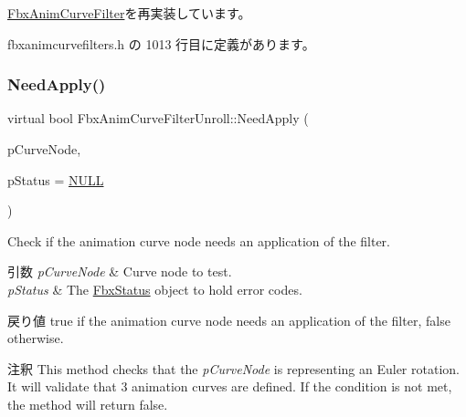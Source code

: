 \hyperlink{class_fbx_anim_curve_filter_a09438dd8d0e9bcb934e6a4b6fc51bcd7}{Fbx\+Anim\+Curve\+Filter}を再実装しています。



 fbxanimcurvefilters.\+h の 1013 行目に定義があります。

\mbox{\label{class_fbx_anim_curve_filter_unroll_ad3df0b89af14237342197a8832e3d94f}} 
\subsubsection{\texorpdfstring{Need\+Apply()}{NeedApply()}\hspace{0.1cm}{\footnotesize\ttfamily [3/5]}}
{\footnotesize\ttfamily virtual bool Fbx\+Anim\+Curve\+Filter\+Unroll\+::\+Need\+Apply (\begin{DoxyParamCaption}\item[{\hyperlink{class_fbx_anim_curve_node}{Fbx\+Anim\+Curve\+Node} \&}]{p\+Curve\+Node,  }\item[{\hyperlink{class_fbx_status}{Fbx\+Status} $\ast$}]{p\+Status = {\ttfamily \hyperlink{fbxarch_8h_a070d2ce7b6bb7e5c05602aa8c308d0c4}{N\+U\+LL}} }\end{DoxyParamCaption})\hspace{0.3cm}{\ttfamily [virtual]}}

Check if the animation curve node needs an application of the filter. 
\begin{DoxyParams}{引数}
{\em p\+Curve\+Node} & Curve node to test. \\
\hline
{\em p\+Status} & The \hyperlink{class_fbx_status}{Fbx\+Status} object to hold error codes. \\
\hline
\end{DoxyParams}
\begin{DoxyReturn}{戻り値}
{\ttfamily true} if the animation curve node needs an application of the filter, {\ttfamily false} otherwise. 
\end{DoxyReturn}
\begin{DoxyRemark}{注釈}
This method checks that the {\itshape p\+Curve\+Node} is representing an Euler rotation. It will validate that 3 animation curves are defined. If the condition is not met, the method will return {\ttfamily false}. 
\end{DoxyRemark}


